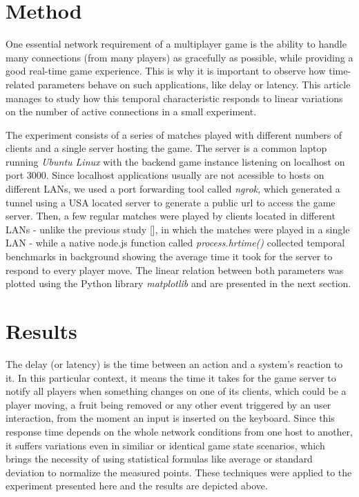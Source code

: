 \documentclass[english]{sbrt}
\begin{document}
\section{\textbf{Method}}

One essential network requirement of a multiplayer game is the ability to handle many connections (from many players) as gracefully as possible, while providing a good real-time game experience. This is why it is important to observe how time-related parameters behave on such applications, like delay or latency. This article manages to study how this temporal characteristic responds to linear variations on the number of active connections in a small experiment.

The experiment consists of a series of matches played with different numbers of clients and a single server hosting the game.
The server is a common laptop running \textit{Ubuntu Linux} with the backend game instance listening on localhost on port 3000. Since localhost applications usually are not acessible to hosts on different LANs, we used a port forwarding tool called \textit{ngrok}, which generated a tunnel using a USA located server to generate a public url to access the game server. Then, a few regular matches were played by clients located in different LANs - unlike the previous study [], in which the matches were played in a single LAN - while a native node.js function called \textit{process.hrtime()} collected temporal benchmarks in background showing the average time it took for the server to respond to every player move. The linear relation between both parameters was plotted using the Python library \textit{matplotlib} and are presented in the next section.

\section{\textbf{Results}}

The delay (or latency) is the time between an action and a system's reaction to it. In this particular context, it means the time it takes for the game server to notify all players when something changes on one of its clients, which could be a player moving, a fruit being removed or any other event triggered by an user interaction, from the moment an input is inserted on the keyboard. Since this response time depends on the whole network conditions from one host to another, it suffers variations even in similiar or identical game state scenarios, which brings the necessity of using statistical formulas like average or standard deviation to normalize the measured points. These techniques were applied to the experiment presented here and the results are depicted above.
\end{document}
